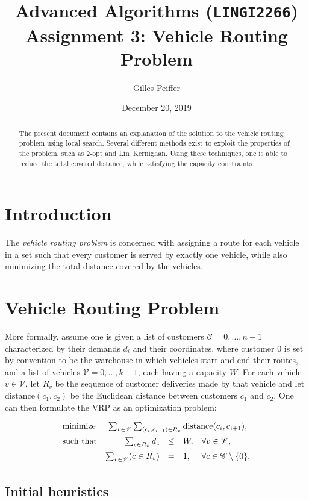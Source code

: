\documentclass[journal]{IEEEtran}
\title{Advanced Algorithms (\texttt{LINGI2266}) \\ Assignment 3: Vehicle Routing Problem}
\author{Gilles Peiffer}
\date{December 20, 2019}
\begin{document}
\maketitle

\begin{abstract}
	The present document contains an explanation of the solution to the vehicle routing problem using local search.
	Several different methods exist to exploit the properties of the problem, such as 2-opt and Lin--Kernighan.
	Using these techniques, one is able to reduce the total covered distance, while satisfying the capacity constraints.
\end{abstract}

\section{Introduction}
\label{sec:intro}
The \emph{vehicle routing problem} is concerned with assigning a route for each vehicle in a set such that every customer is served by exactly one vehicle, while also minimizing the total distance covered by the vehicles.

\section{Vehicle Routing Problem}
More formally, assume one is given a list of customers \(\mathscr{C} = 0, \ldots, n-1\) characterized by their demands \(d_i\) and their coordinates, where customer 0 is set by convention to be the warehouse in which vehicles start and end their routes, and a list of vehicles \(\mathscr{V} = 0, \ldots, k-1\), each having a capacity \(W\).
For each vehicle \(v \in \mathscr{V}\), let \(R_v\) be the sequence of customer deliveries made by that vehicle and let \(\mathrm{distance}(c_1, c_2)\) be the Euclidean distance between customers \(c_1\) and \(c_2\).
One can then formulate the VRP as an optimization problem:
\[
\renewcommand{\arraystretch}{1.5}
\begin{array}{lrcl@{\quad}l}
	\textnormal{minimize} & \multicolumn{4}{c}{\sum_{v \in \mathscr{V}} \sum_{(c_i, c_{i+1}) \in R_v} \mathrm{distance}(c_i, c_{i+1}),}\\
	\textnormal{such that} & \sum_{c \in R_v} d_c & \le & W, & \forall v \in \mathscr{V},\\
	& \sum_{v \in \mathscr{V}} (c \in R_v) & = & 1, & \forall c \in \mathscr{C} \setminus \{0\}.
\end{array}
\]

\subsection{Initial heuristics}
\end{document}

